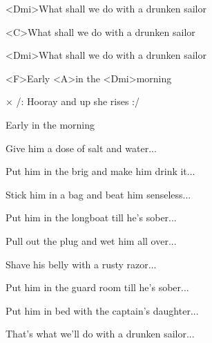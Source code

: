 

\zs
<Dmi>What shall we do with a drunken sailor

<C>What shall we do with a drunken sailor

<Dmi>What shall we do with a drunken sailor

<F>Early <A>in the <Dmi>morning
\ks

× /: Hooray and up she rises :/

Early in the morning
\kr

\zs
Give him a dose of salt and water...
\ks

\zs
Put him in the brig and make him drink it...
\ks

\zs
Stick him in a bag and beat him senseless...
\ks

\zs
Put him in the longboat till he's sober...
\ks

\zs
Pull out the plug and wet him all over...
\ks

\zs
Shave his belly with a rusty razor...
\ks

\zs
Put him in the guard room till he's sober...
\ks

\zs
Put him in bed with the captain's daughter...
\ks

\zs
That's what we'll do with a drunken sailor...
\ks

\kp
